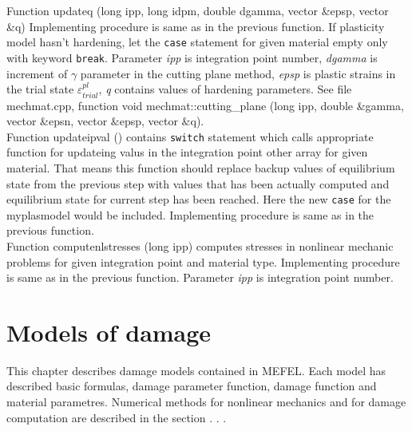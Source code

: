 Function {\sf updateq (long ipp, long idpm, double dgamma, vector \&epsp, vector \&q)}
Implementing procedure is same as in the previous function. If plasticity model hasn't hardening, let the {\tt case}
statement for given material empty only with keyword {\tt break}. Parameter {\it ipp} is integration point number,
{\it dgamma} is increment of $\gamma$ parameter in the cutting plane method, {\it epsp} is plastic strains in the
trial state $\varepsilon^{pl}_{trial}$, {\it q} contains values of hardening parameters. See file mechmat.cpp, function
{\sf void mechmat::cutting\_plane (long ipp, double \&gamma, vector \&epsn, vector $\&$epsp, vector $\&$q)}.\\

Function {\sf updateipval ()} contains {\tt switch} statement which calls appropriate function for updateing valus in the
integration point {\sf other} array for given material. That means this function should replace backup values of equilibrium
state from the previous step with values that has been actually computed and equilibrium state for current step
has been reached. Here the new {\tt case} for the  {\sf myplasmodel} would be included. Implementing procedure is same
as in the previous function.\\

Function {\sf computenlstresses (long ipp)} computes stresses in nonlinear mechanic problems for given integration
point and material type. Implementing procedure is same as in the previous function. Parameter {\it ipp} is integration
point number.






\section{Models of damage}

This chapter describes damage models contained in MEFEL. Each model has described basic formulas,
damage parameter function, damage function and material parametres. Numerical methods for nonlinear
mechanics and for damage computation are described in the section . . .

